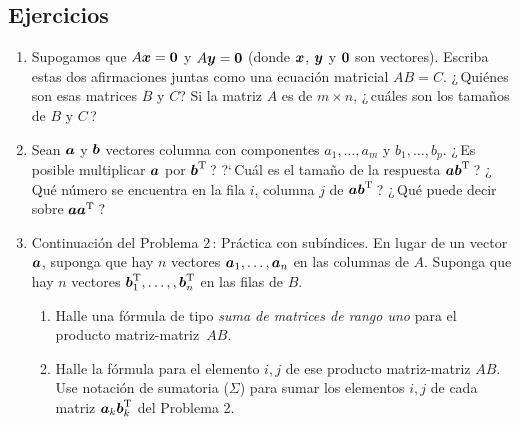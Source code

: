 \documentclass[12pt,a4paper]{article}
\newcommand{\bi}[1]{\hbox{\boldmath$#1$}}
\newcommand\1{\mbox{\,\vrule height-0.8pt depth1.0pt width2pc\,}}
\newcommand\2{\mbox{\,\vrule height-0.8pt depth1.0pt width1pc\,}}
\DeclareRobustCommand\transp{^{\mathrm{T}}}
\begin{document}
\subsection*{Ejercicios}
\begin{enumerate}
\item Supogamos que $A\bi{x}= \bi{0}$ y $A\bi{y}= \bi{0}$ (donde $\bi{x}$, $\bi{y}$ y $\bi{0}$ son vectores).
Escriba estas dos afirmaciones juntas como una ecuaci\'on matricial $AB=C$. ¿\,Quiénes son esas matrices $B$ y $C$? Si la matriz $A$ es de $m \times n$, ¿\,cuáles son los tamaños de $B$ y $C$\,?


\item Sean $\bi{a}$ y $\bi{b}$ vectores columna con   componentes $a_{1},\dots, a_{m}$ y $b_{1}, \dots ,b_{p}$.
¿\,Es posible multiplicar $\bi{a}$ por $\bi{b}^{\mathrm{T}}$\,? ?`\,Cuál es el tamaño de la respuesta $\bi{a}\bi{b}^{\mathrm{T}}$\,?
¿\,Qué número se encuentra en la fila $i$, columna $j$ de $\bi{a}\bi{b}^{\mathrm{T}}$\,? ¿\,Qué puede decir sobre $\bi{a}\bi{a}^{\mathrm{T}}$\,?

\item Continuación del Problema 2\,: Práctica con subíndices. En lugar de un vector $\bi{a}$, suponga que hay $n$ vectores $\bi{a}_{1},\dots,\bi{a}_{n}$ en las columnas de $A$. Suponga que hay $n$ vectores $\bi{b}_{1}^{\mathrm{T}},\dots,,\bi{b}_{n}^{\mathrm{T}}$ en las filas de $B$.


\begin{enumerate}\itemsep=0pt
\item [(a)] Halle una fórmula de tipo \emph{suma de matrices de rango uno} para el producto matriz-matriz~$AB$.

\item [(b)] Halle la fórmula para el elemento  $i, j$ de ese producto matriz-matriz $AB$. Use notación de sumatoria ($\Sigma$) para sumar los elementos $i, j$ de cada matriz $\bi{a}_{k}\bi{b}_{k}^{\mathrm{T}}$ del Problema 2.


\end{enumerate}
\end{enumerate}
\end{document}
